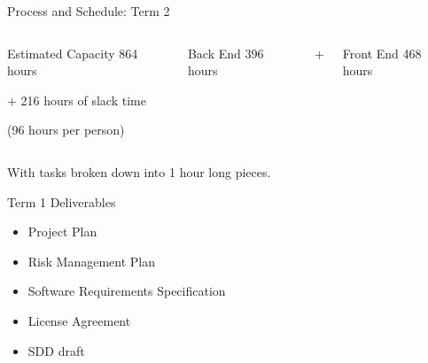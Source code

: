 \documentclass[smaller, aspectratio=169]{beamer}
\begin{document}
    \begin{frame}{Process and Schedule: Term 2}
      \begin{columns}

      \begin{column}{.25\textwidth}
        \begin{block}{Estimated Capacity}
          864 hours

          + 216 hours of slack time

          (96 hours per person)
          \end{block}
        \end{column}


        \begin{column}{.15\textwidth}
          \begin{block}{Back End}
            396 hours
          \end{block}
        \end{column}

        \begin{column}{.01\textwidth}
          \begin{block}{+}
          \end{block}
        \end{column}

        \begin{column}{.15\textwidth}
          \begin{block}{Front End}
            468 hours
          \end{block}
        \end{column}

      \end{columns}
      \bigskip

      With tasks broken down into 1 hour long pieces.
    \end{frame}



  \begin{frame}{Term 1 Deliverables}
    \begin{itemize}
        \item Project Plan
        \item Risk Management Plan
        \item Software Requirements Specification
        \item License Agreement
        \item SDD draft
    \end{itemize}
  \end{frame}
\end{document}
